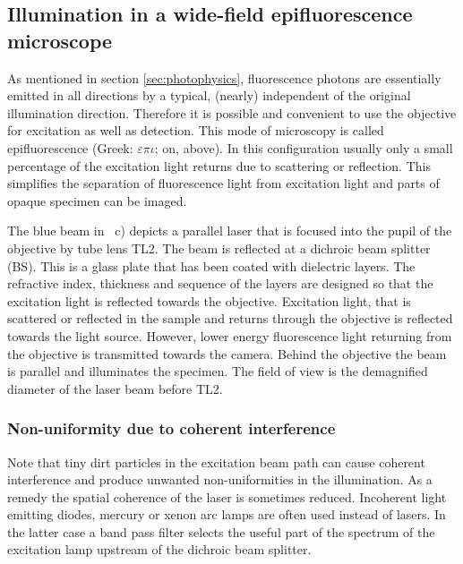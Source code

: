 \subsection{Illumination in a wide-field epifluorescence microscope}
As mentioned in section \ref{sec:photophysics}, fluorescence photons
are essentially emitted in all directions by a typical, (nearly)
independent of the original illumination direction. Therefore it is
possible and convenient to use the objective for excitation as well as
detection. This mode of microscopy is called epifluorescence (Greek:
$\varepsilon\pi\iota$; on, above).  In this configuration usually only
a small percentage of the excitation light returns due to scattering
or reflection. This simplifies the separation of fluorescence light
from excitation light and parts of opaque specimen can be imaged.

The blue beam in ~c) depicts a
parallel laser that is focused into the pupil of the objective by tube
lens TL2. The beam is reflected at a dichroic beam splitter (BS). This
is a glass plate that has been coated with dielectric layers. The
refractive index, thickness and sequence of the layers are designed so
that the excitation light is reflected towards the
objective. Excitation light, that is scattered or reflected in the
sample and returns through the objective is reflected towards the
light source. However, lower energy fluorescence light returning from
the objective is transmitted towards the camera. Behind the objective
the beam is parallel and illuminates the specimen. The field of view
is the demagnified diameter of the laser beam before TL2.

\subsubsection*{Non-uniformity due to coherent interference}
Note that tiny dirt particles in the excitation beam path can cause
coherent interference and produce unwanted non-uniformities in the
illumination. As a remedy the spatial coherence of the laser is
sometimes reduced.  Incoherent light emitting diodes, mercury or xenon
arc lamps are often used instead of lasers. In the latter case a band
pass filter selects the useful part of the spectrum of the excitation
lamp upstream of the dichroic beam splitter.

